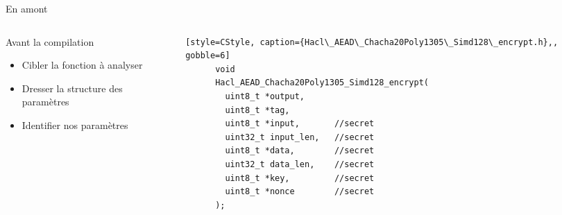 \documentclass[A4,svgnames,9pt,aspectratio=169]{beamer}
\begin{document}
\begin{frame}{En amont}

  \begin{columns}
  \begin{column}{0.3\textwidth}
    \begin{block}{Avant la compilation}
      \begin{itemize}
        \item Cibler la fonction à analyser
        \item Dresser la structure des paramètres
        \item Identifier nos paramètres
      \end{itemize}
    \end{block}      
  \end{column}


  \begin{column}{0.7\textwidth}
    \begin{lstlisting}[style=CStyle, caption={Hacl\_AEAD\_Chacha20Poly1305\_Simd128\_encrypt.h},, gobble=6]
      void
      Hacl_AEAD_Chacha20Poly1305_Simd128_encrypt(
        uint8_t *output,
        uint8_t *tag,         
        uint8_t *input,       //secret
        uint32_t input_len,   //secret
        uint8_t *data,        //secret
        uint32_t data_len,    //secret
        uint8_t *key,         //secret
        uint8_t *nonce        //secret
      );
    \end{lstlisting}
  \end{column}
  \end{columns}
\end{frame}

\end{document}
